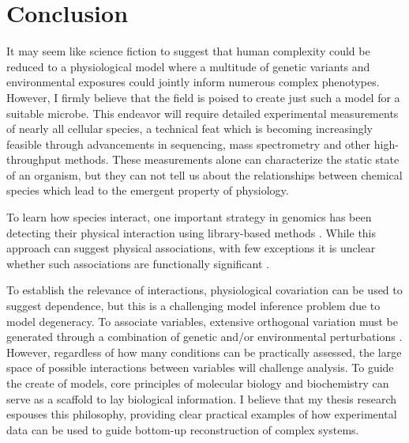 \section{Conclusion}

It may seem like science fiction to suggest that human complexity could be reduced to a physiological model where a multitude of genetic variants and environmental exposures could jointly inform numerous complex phenotypes. However, I firmly believe that the field is poised to create just such a model for a suitable microbe. This endeavor will require detailed experimental measurements of nearly all cellular species, a technical feat which is becoming increasingly feasible through advancements in sequencing, mass spectrometry and other high-throughput methods. These measurements alone can characterize the static state of an organism, but they can not tell us about the relationships between chemical species which lead to the emergent property of physiology. 

To learn how species interact, one important strategy in genomics has been detecting their physical interaction using library-based methods \cite{LiebermanAiden:2009jz, Fields:1989dm, Orsak:2012ci, Johnson:2007fh}.  While this approach can suggest physical associations, with few exceptions \cite{Reynolds:2011gs} it is unclear whether such associations are functionally significant \cite{Nandy:2010ej, Scheer:2011df}. 

To establish the relevance of interactions, physiological covariation can be used to suggest dependence, but this is a challenging model inference problem due to model degeneracy. To associate variables, extensive orthogonal variation must be generated through a combination of genetic and/or environmental perturbations \cite{Greenberg:2011jf}. However, regardless of how many conditions can be practically assessed, the large space of possible interactions between variables will challenge analysis. To guide the create of models, core principles of molecular biology and biochemistry can serve as a scaffold to lay biological information. I believe that my thesis research espouses this philosophy, providing clear practical examples of how experimental data can be used to guide bottom-up reconstruction of complex systems.

